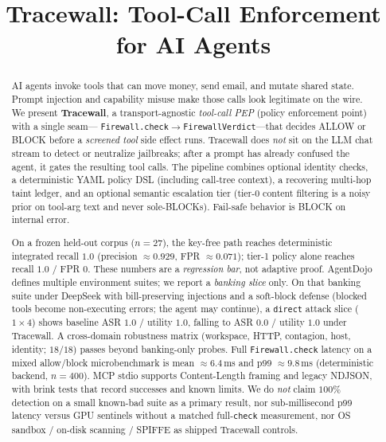 \documentclass[conference]{IEEEtran}
\title{Tracewall: Tool-Call Enforcement for AI Agents}
\author{
  \IEEEauthorblockN{beejak}
  \IEEEauthorblockA{
    \url{beejak@users.noreply.github.com}\\
    Draft preprint --- enforcement-only companion to \emph{agentwatch}\\
    Artifacts: \url{https://github.com/beejak/agentwatch-firewall}\\
    Evidence ledger: \path{paper/EVIDENCE.md} (through 2026-07-22)
  }
}
\begin{document}
\maketitle

\begin{abstract}
AI agents invoke tools that can move money, send email, and mutate shared state.
Prompt injection and capability misuse make those calls look legitimate on the wire.
We present \textbf{Tracewall}, a transport-agnostic \emph{tool-call PEP} (policy
enforcement point) with a single seam---
\texttt{Firewall.check}$\rightarrow$\texttt{FirewallVerdict}---that decides ALLOW or BLOCK
before a \emph{screened tool} side effect runs.
Tracewall does \emph{not} sit on the LLM chat stream to detect or neutralize jailbreaks;
after a prompt has already confused the agent, it gates the resulting tool calls.
The pipeline combines optional identity checks, a deterministic
YAML policy DSL (including call-tree context), a recovering multi-hop taint ledger, and an
optional semantic escalation tier (tier-0 content filtering is a noisy prior on tool-arg
text and never sole-BLOCKs). Fail-safe behavior is BLOCK on internal error.

On a frozen held-out corpus ($n{=}27$), the key-free path reaches deterministic integrated
recall $1.0$ (precision $\approx 0.929$, FPR $\approx 0.071$); tier-1 policy alone reaches
recall $1.0$ / FPR $0$. These numbers are a \emph{regression bar}, not adaptive proof.
AgentDojo defines multiple environment suites; we report a \emph{banking slice} only.
On that banking suite under DeepSeek with bill-preserving injections and a soft-block defense
(blocked tools become non-executing errors; the agent may continue), a \texttt{direct} attack
slice ($1{\times}4$) shows baseline ASR $1.0$ / utility $1.0$, falling to ASR $0.0$ / utility
$1.0$ under Tracewall. A cross-domain robustness matrix (workspace, HTTP, contagion, host,
identity; $18/18$) passes beyond banking-only probes. Full \texttt{Firewall.check} latency
on a mixed allow/block microbenchmark is mean $\approx 6.4$\,ms and p99 $\approx 9.8$\,ms
(deterministic backend, $n{=}400$). MCP stdio supports Content-Length framing and legacy
NDJSON, with brink tests that record successes and known limits.
We do \emph{not} claim $100\%$ detection on a small known-bad suite as a primary result,
nor sub-millisecond p99 latency versus GPU sentinels without a matched full-\texttt{check}
measurement, nor OS sandbox / on-disk scanning / SPIFFE as shipped Tracewall controls.
\end{abstract}
\end{document}
